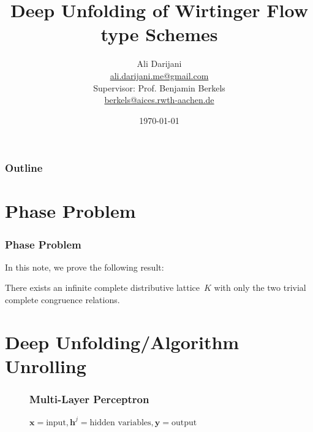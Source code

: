 \documentclass{beamer}
\theoremstyle{definition}
\theoremstyle{remark}
\begin{document}
\title[Deep Unfolding of Wirtinger Flow type Schemes]{Deep Unfolding of Wirtinger Flow type Schemes}
\author[]{Ali Darijani\\ \href{mailto:ali.darijani.me@gmail.com}{ali.darijani.me@gmail.com}\newline
\\ Supervisor: Prof. Benjamin Berkels\\ \href{mailto:berkels@aices.rwth-aachen.de}{berkels@aices.rwth-aachen.de}
}

\date{\today}

\begin{frame}
\titlepage
\end{frame}

\begin{frame}
\frametitle{Outline}

\tableofcontents[pausesections]
\end{frame}

\section{Phase Problem}

\begin{frame}
\frametitle{Phase Problem}

In this note, we prove the following result:

\begin{theorem} 
There exists an infinite complete distributive 
lattice~$K$ with only the two trivial complete 
congruence relations.
\end{theorem}
\end{frame}

\section[Deep Unfolding]{Deep Unfolding/Algorithm Unrolling}

\begin{frame}
  \begin{figure}
    \frametitle{Multi-Layer Perceptron}
    \centering
    \resizebox{1.0\textwidth}{!}{}
    \caption{$\boldsymbol{x} =\text{input},\boldsymbol{h}^j=\text{hidden variables},\boldsymbol{y}=\text{output}$}
    \label{fig:multi_layer_perceptron}
  \end{figure}
\end{frame}
\end{document}
